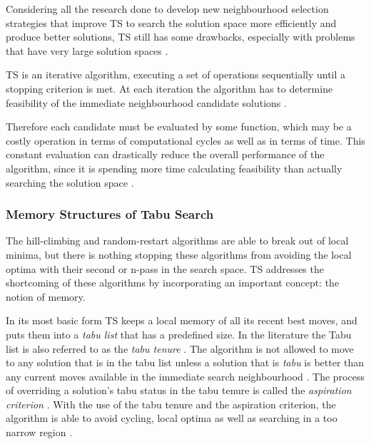 Considering all the research done to develop new neighbourhood selection strategies that improve TS to search the solution space more efficiently and produce better solutions, TS still has some drawbacks, especially with problems that have very large solution spaces \cite{EvoParallelTabu}.

TS is an iterative algorithm, executing a set of operations sequentially until a stopping criterion is met\cite{EvoParallelTabu,TabuVechicleRoutingWithTimeWindows}. At each iteration the algorithm has to determine feasibility of the immediate neighbourhood candidate solutions \cite{EvoParallelTabu,TabuVechicleRoutingWithTimeWindows}. 

Therefore each candidate must be evaluated by some function, which may be a costly operation in terms of computational cycles as well as in terms of time\cite{EvoParallelTabu,TabuVechicleRoutingWithTimeWindows}. This constant evaluation can drastically reduce the overall performance of the algorithm, since it is spending more time calculating feasibility than actually searching the solution space \cite{EvoParallelTabu,TabuVechicleRoutingWithTimeWindows}. 

\subsubsection{Memory Structures of Tabu Search}
The hill-climbing and random-restart algorithms are able to break out of local minima, but there is nothing stopping these algorithms from avoiding the local optima with their second or n-pass in the search space. TS addresses the shortcoming of these algorithms by incorporating an important concept: the notion of memory.

In its most basic form TS keeps a local memory of all its recent best moves, and puts them into a \emph{tabu list} that has a predefined size. In the literature the Tabu list is also referred to as the \emph{tabu tenure} \cite{TSHazardous,TabuCarryOver,ReactiveTabuVHR,TabuParameterization}. The algorithm is not allowed to move to any solution that is in the tabu list unless a solution that is \emph{tabu} is better than any current moves available in the immediate search neighbourhood \cite{TSHazardous,TabuCarryOver,ReactiveTabuVHR,TabuParameterization}. The process of overriding a solution's tabu status in the tabu tenure is called the \emph{aspiration criterion} \cite{TSHazardous,TabuCarryOver,ReactiveTabuVHR,TabuParameterization}. With the use of the tabu tenure and the aspiration criterion, the algorithm is able to avoid cycling, local optima as well as searching in a too narrow region \cite{TabuSingleMachineScheduling,CircuitTabu}.

